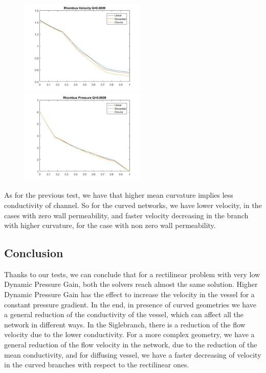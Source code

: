 \documentclass[a4paper]{report}
\begin{document}
\begin{figure}[htbp]
\centering
\includegraphics[width= 60mm]{Rombus_Velocity1}%
\qquad \qquad
\includegraphics[width= 60mm]{Rombus_Pressure1}
\end{figure}

As for the previous test, we have that higher mean curvature implies less conductivity of channel. So for the curved networks, we have lower velocity, in the cases with zero wall permeability, and faster velocity decreasing in the branch with higher curvature, for the case with non zero wall permeability.

\subsection{Conclusion}
Thanks to our tests, we can conclude that for a rectilinear problem with very low Dynamic Pressure Gain, both the solvers reach almost the same solution.
Higher Dynamic Pressure Gain has the effect to increase the velocity in the vessel for a constant pressure gradient.
In the end, in presence of curved geometries we have a general reduction of the conductivity of the vessel, which can affect all the network in different ways. In the Siglebranch, there is a reduction of the flow velocity due to the lower conductivity. For a more complex geometry, we have a general reduction of the flow velocity in the network, due to the reduction of the mean conductivity, and for diffusing vessel, we have a faster decreasing of velocity in the curved branches with respect to the rectilinear ones.

\newpage
\end{document}
